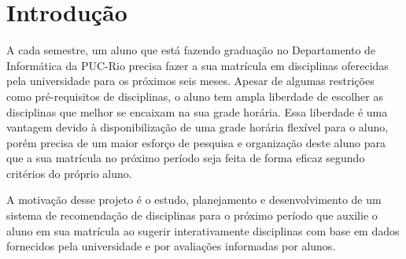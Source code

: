 
\chapter{Introdução}

A cada semestre, um aluno que está fazendo graduação no Departamento de Informática da PUC-Rio precisa fazer a sua matrícula em disciplinas oferecidas pela universidade para os próximos seis meses. Apesar de algumas restrições como pré-requisitos de disciplinas, o aluno tem ampla liberdade de escolher as disciplinas que melhor se encaixam na sua grade horária. Essa liberdade é uma vantagem devido à disponibilização de uma grade horária flexível para o aluno, porém precisa de um maior esforço de pesquisa e organização deste aluno para que a sua matrícula no próximo período seja feita de forma eficaz segundo critérios do próprio aluno. 

A motivação desse projeto é o estudo, planejamento e desenvolvimento de um sistema de recomendação de disciplinas para o próximo período que auxilie o aluno em sua matrícula ao sugerir interativamente disciplinas com base em dados fornecidos pela universidade e por avaliações informadas por alunos.